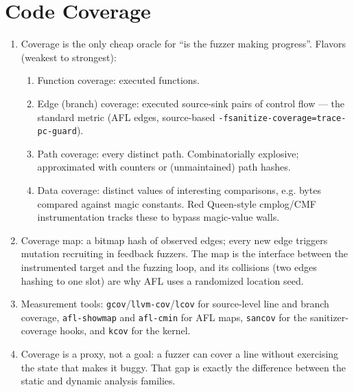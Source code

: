 \documentclass[12pt]{Training}
\begin{document}
\section*{Code Coverage}
\begin{enumerate}
	\item Coverage is the only cheap oracle for ``is the fuzzer making progress''. Flavors (weakest to strongest):
	\begin{enumerate}
	    \item Function coverage: executed functions.
	    \item Edge (branch) coverage: executed source-sink pairs of control flow --- the standard metric (AFL edges, source-based \lstinline{-fsanitize-coverage=trace-pc-guard}).
	    \item Path coverage: every distinct path. Combinatorially explosive; approximated with counters or (unmaintained) path hashes.
	    \item Data coverage: distinct values of interesting comparisons, e.g. bytes compared against magic constants. Red Queen-style cmplog/CMF instrumentation tracks these to bypass magic-value walls.
	\end{enumerate}
	\item Coverage map: a bitmap hash of observed edges; every new edge triggers mutation recruiting in feedback fuzzers. The map is the interface between the instrumented target and the fuzzing loop, and its collisions (two edges hashing to one slot) are why AFL uses a randomized location seed.
	\item Measurement tools: \lstinline{gcov}/\lstinline{llvm-cov}/\lstinline{lcov} for source-level line and branch coverage, \lstinline{afl-showmap} and \lstinline{afl-cmin} for AFL maps, \lstinline{sancov} for the sanitizer-coverage hooks, and \lstinline{kcov} for the kernel.
	\item Coverage is a proxy, not a goal: a fuzzer can cover a line without exercising the state that makes it buggy. That gap is exactly the difference between the static and dynamic analysis families.
\end{enumerate}
\end{document}
